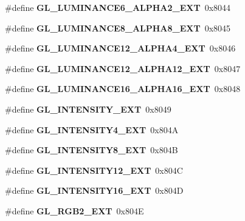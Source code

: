 \begin{DoxyCompactItemize}
\item 
\#define {\bfseries G\+L\+\_\+\+L\+U\+M\+I\+N\+A\+N\+C\+E6\+\_\+\+A\+L\+P\+H\+A2\+\_\+\+E\+X\+T}~0x8044\label{_s_d_l__opengl_8h_a2e37359b96570765f1cc77158f11fd4c}

\item 
\#define {\bfseries G\+L\+\_\+\+L\+U\+M\+I\+N\+A\+N\+C\+E8\+\_\+\+A\+L\+P\+H\+A8\+\_\+\+E\+X\+T}~0x8045\label{_s_d_l__opengl_8h_acff22a34c242014d75eebaa8ca8653e4}

\item 
\#define {\bfseries G\+L\+\_\+\+L\+U\+M\+I\+N\+A\+N\+C\+E12\+\_\+\+A\+L\+P\+H\+A4\+\_\+\+E\+X\+T}~0x8046\label{_s_d_l__opengl_8h_ac13c3946b177ea60013ab9f6aba5c4f3}

\item 
\#define {\bfseries G\+L\+\_\+\+L\+U\+M\+I\+N\+A\+N\+C\+E12\+\_\+\+A\+L\+P\+H\+A12\+\_\+\+E\+X\+T}~0x8047\label{_s_d_l__opengl_8h_a5dad1451379dbd5a3202bbb846298ae6}

\item 
\#define {\bfseries G\+L\+\_\+\+L\+U\+M\+I\+N\+A\+N\+C\+E16\+\_\+\+A\+L\+P\+H\+A16\+\_\+\+E\+X\+T}~0x8048\label{_s_d_l__opengl_8h_a1e418ba0cabe421c3def1cfae9148c69}

\item 
\#define {\bfseries G\+L\+\_\+\+I\+N\+T\+E\+N\+S\+I\+T\+Y\+\_\+\+E\+X\+T}~0x8049\label{_s_d_l__opengl_8h_a98a8c54a5e7c1c800f89c066f93da46d}

\item 
\#define {\bfseries G\+L\+\_\+\+I\+N\+T\+E\+N\+S\+I\+T\+Y4\+\_\+\+E\+X\+T}~0x804\+A\label{_s_d_l__opengl_8h_a5407a22ab99b1b24203252e4a9303e20}

\item 
\#define {\bfseries G\+L\+\_\+\+I\+N\+T\+E\+N\+S\+I\+T\+Y8\+\_\+\+E\+X\+T}~0x804\+B\label{_s_d_l__opengl_8h_aedaa6d09c50b8512d334eeba0e93f78d}

\item 
\#define {\bfseries G\+L\+\_\+\+I\+N\+T\+E\+N\+S\+I\+T\+Y12\+\_\+\+E\+X\+T}~0x804\+C\label{_s_d_l__opengl_8h_aa8c68030256380465cff554bc68e630a}

\item 
\#define {\bfseries G\+L\+\_\+\+I\+N\+T\+E\+N\+S\+I\+T\+Y16\+\_\+\+E\+X\+T}~0x804\+D\label{_s_d_l__opengl_8h_aead9e0d7fda38540fc52ab6da157d4e7}

\item 
\#define {\bfseries G\+L\+\_\+\+R\+G\+B2\+\_\+\+E\+X\+T}~0x804\+E\label{_s_d_l__opengl_8h_ae91828b5b76cd9453b63730eac82b4c0}


\end{DoxyCompactItemize}
